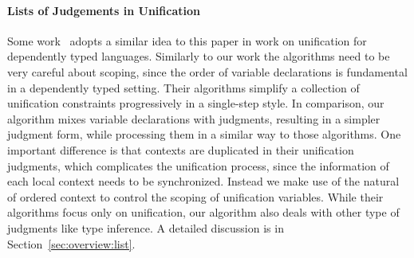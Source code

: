 \paragraph{Lists of Judgements in Unification}
Some work~\cite{Reed2009,Abel2011higher} adopts a similar idea to this paper
in work on unification for dependently typed languages. Similarly to our work
the algorithms need to be very careful about scoping, since the order of variable
declarations is fundamental in a dependently typed setting. 
Their algorithms simplify a collection of unification constraints progressively in a single-step style.
In comparison, our algorithm mixes variable declarations with judgments,
resulting in a simpler judgment form,
while processing them in a similar way to those algorithms.
One important difference is that contexts are
duplicated in their unification judgments, which complicates the unification process,
since the information of each local context needs to be synchronized.
Instead we make use of the natural of ordered context to control the scoping of unification variables.
While their algorithms focus only on unification,
our algorithm also deals with other type of judgments like type inference.
A detailed discussion is in Section~\ref{sec:overview:list}.
